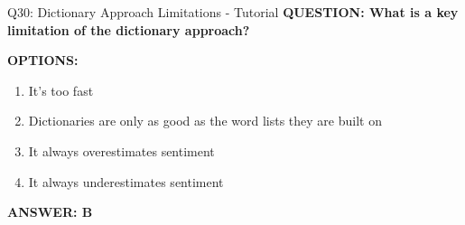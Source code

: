 \documentclass[8pt]{beamer}
\begin{document}
	\begin{frame}{Q30: Dictionary Approach Limitations - Tutorial}
		\fontsize{6.5}{7.5}\selectfont
		\textbf{QUESTION: What is a key limitation of the dictionary approach?}
		
		\vspace{0.1cm}
		\textbf{OPTIONS:}
		\begin{enumerate}
			\item It's too fast
			\item Dictionaries are only as good as the word lists they are built on
			\item It always overestimates sentiment
			\item It always underestimates sentiment
		\end{enumerate}
		
		\vspace{0.1cm}
		\textcolor{myblue}{\textbf{ANSWER: B}}
		

\end{frame}
\end{document}
